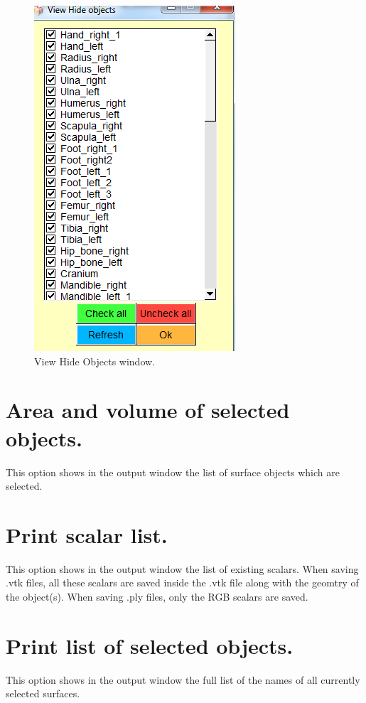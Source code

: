 \begin{figure}
  \centering
  \includegraphics[scale=0.7]{images/Show/View_hide_objects_window.png} 
	\caption{View Hide Objects window.}
\label{view_hide_objects}
 
\end{figure}



\section{Area and volume of selected objects.}
This option shows in the output window the list of surface objects which are selected.

\section{Print scalar list.}
This option shows in the output window the list of existing scalars. When saving .vtk files, all these
scalars are saved inside the .vtk file along with the geomtry of the object(s). When saving .ply files,
only the RGB scalars are saved.

\section{Print list of selected objects.}
This option shows in the output window the full list of the names of all currently selected surfaces.
